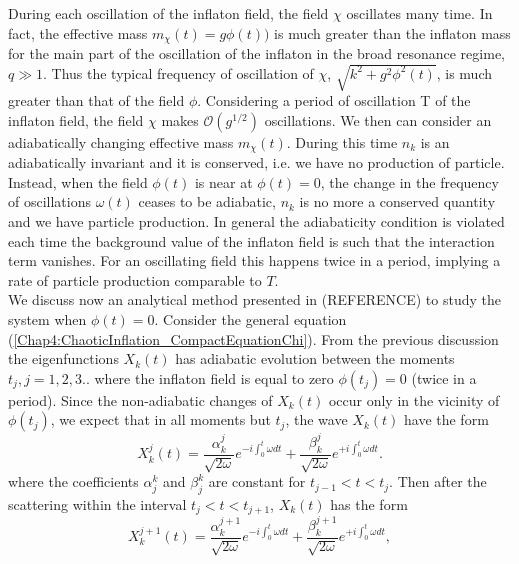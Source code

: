 \documentclass[11pt,a4paper,twoside]{book}
\begin{document}
During each oscillation of the inflaton field, the field $ \chi $ oscillates many time. In fact, the effective mass $ m_{\chi}(t) = g\phi(t)) $ is much greater than the inflaton mass for the main part of the oscillation of the inflaton in the broad resonance regime, $ q \gg  1$. Thus the typical frequency of oscillation of $ \chi $, $\sqrt{k^{2} + g^{2}\phi^{2}(t)}$, is much greater than that of the field $\phi$. Considering a period of oscillation T of the inflaton field, the field $ \chi $ makes $\mathcal{O}(g^{1/2})$ oscillations. We then can consider an adiabatically changing effective mass $ m_{\chi}(t) $. During this time $ n_{k} $ is an adiabatically invariant and it is conserved, i.e. we have no production of particle. Instead, when the field $ \phi(t) $ is near at $ \phi(t)=0 $, the change in the frequency of oscillations $ \omega(t) $ ceases to be adiabatic, $ n_{k} $ is no more a conserved quantity and we have particle production. In general the adiabaticity condition is violated each time the background value of the inflaton field is such that the interaction term vanishes. For an oscillating field this happens twice in a period, implying a rate of particle production comparable to $ T. $\\
We discuss now an analytical method presented in (REFERENCE) to study the system when $ \phi(t)=0 $. Consider the general equation (\ref{Chap4:ChaoticInflation_CompactEquationChi}). From the previous discussion the eigenfunctions $ X_{k}(t) $ has adiabatic evolution between the moments $ t_{j}, j=1,2,3.. $ where the inflaton field is equal to zero $ \phi(t_{j})=0 $ (twice in a period). Since the non-adiabatic changes of $ X_{k}(t) $ occur only in the vicinity of $\phi(t_{j})$, we expect that in all moments but $ t_{j} $, the wave $ X_{k}(t) $ have the form 
\begin{equation}
	\label{Chap4:ParabolicPotential_scatter1}
		X_{k}^{j}(t) = \frac{\alpha^{j}_{k}}{\sqrt{2\omega}}e^{-i\int^{t}_{0} \omega dt} 
	+ \frac{\beta^{j}_{k}}{\sqrt{2\omega}}e^{+i\int^{t}_{0} \omega dt}.
\end{equation}
where the coefficients $ \alpha_{j}^{k} $ and $ \beta_{j}^{k} $ are constant for $ t_{j-1} < t < t_{j} $. Then after the scattering within the interval $ t_{j}<t<t_{j+1} $, $ X_{k}(t) $ has the form
\begin{equation}
\label{Chap4:scattering2}
X_{k}^{j+1}(t) = \frac{\alpha^{j+1}_{k}}{\sqrt{2\omega}}e^{-i\int^{t}_{0} \omega dt} 
+ \frac{\beta^{j+1}_{k}}{\sqrt{2\omega}}e^{+i\int^{t}_{0} \omega dt},
\end{equation}
\end{document}
